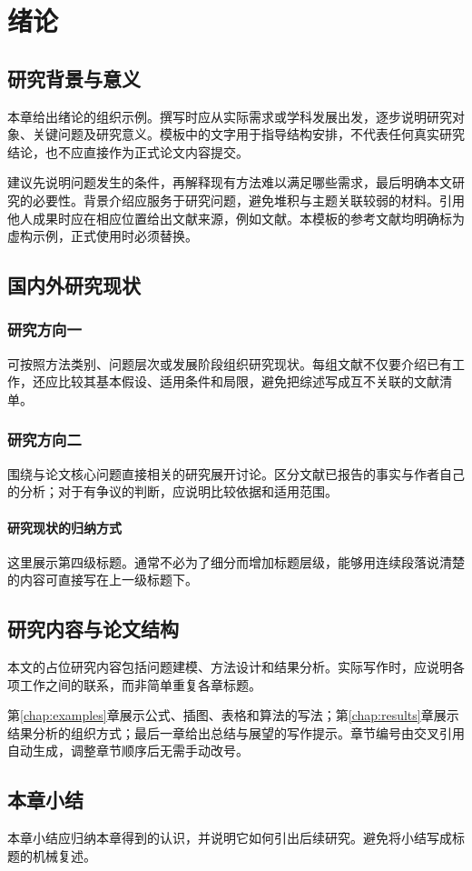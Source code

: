 \chapter{绪论}
\label{chap:introduction}
\section{研究背景与意义}
本章给出绪论的组织示例。撰写时应从实际需求或学科发展出发，逐步说明研究对象、关键问题及研究意义。模板中的文字用于指导结构安排，不代表任何真实研究结论，也不应直接作为正式论文内容提交。

建议先说明问题发生的条件，再解释现有方法难以满足哪些需求，最后明确本文研究的必要性。背景介绍应服务于研究问题，避免堆积与主题关联较弱的材料。引用他人成果时应在相应位置给出文献来源，例如文献\cite{example-book,example-article}。本模板的参考文献均明确标为虚构示例，正式使用时必须替换。
\section{国内外研究现状}
\subsection{研究方向一}
可按照方法类别、问题层次或发展阶段组织研究现状。每组文献不仅要介绍已有工作，还应比较其基本假设、适用条件和局限，避免把综述写成互不关联的文献清单。
\subsection{研究方向二}
围绕与论文核心问题直接相关的研究展开讨论。区分文献已报告的事实与作者自己的分析；对于有争议的判断，应说明比较依据和适用范围。
\subsubsection{研究现状的归纳方式}
这里展示第四级标题。通常不必为了细分而增加标题层级，能够用连续段落说清楚的内容可直接写在上一级标题下。
\section{研究内容与论文结构}
本文的占位研究内容包括问题建模、方法设计和结果分析。实际写作时，应说明各项工作之间的联系，而非简单重复各章标题。

第\ref{chap:examples}章展示公式、插图、表格和算法的写法；第\ref{chap:results}章展示结果分析的组织方式；最后一章给出总结与展望的写作提示。章节编号由交叉引用自动生成，调整章节顺序后无需手动改号。
\section{本章小结}
本章小结应归纳本章得到的认识，并说明它如何引出后续研究。避免将小结写成标题的机械复述。
